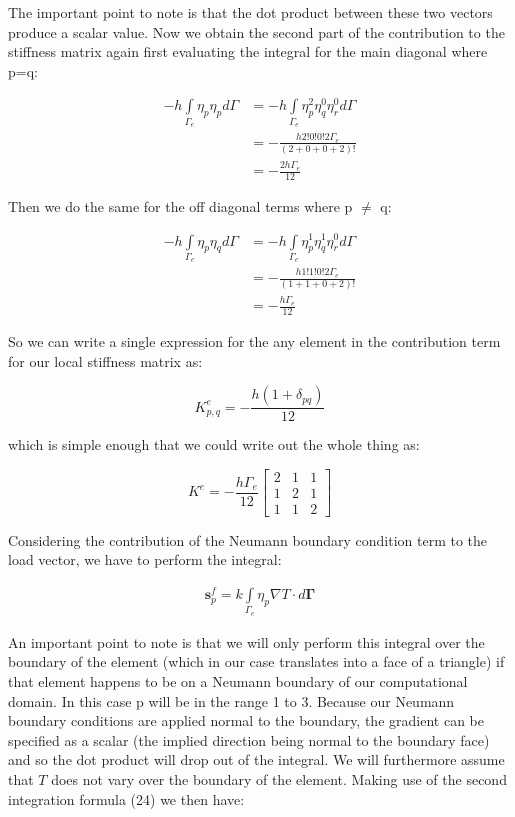 \documentclass[12pt]{article}
\begin{document}
The important point to note is that the dot product between these two vectors
produce a scalar value. Now we obtain the second part of the contribution to the stiffness matrix again first evaluating the integral for the main diagonal where p=q:

\begin{align*}
 -h \int\limits_{\Gamma_e} \eta_p \eta_p d\Gamma & = 
 -h\int\limits_{\Gamma_e} \eta_p^2 \eta_q^0 \eta_r^0  d{\Gamma} \\
 & = -\frac{h 2!0!0!2\Gamma_e}{(2+0+0+2)!} \\
 & = -\frac{2h\Gamma_e}{12}
\end{align*}

Then we do the same for the off diagonal terms where p $\neq$ q:

\begin{align*}
 -h \int\limits_{\Gamma_e} \eta_p \eta_q d\Gamma & = 
 -h\int\limits_{\Gamma_e} \eta_p^1 \eta_q^1 \eta_r^0  d{\Gamma} \\
 & = -\frac{h 1!1!0!2\Gamma_e}{(1+1+0+2)!} \\
 & = -\frac{h\Gamma_e}{12}
\end{align*}

So we can write a single expression for the any element in the contribution term for our local stiffness matrix as:

$$
K_{p,q}^e =- \frac{h (1+\delta_{pq})}{12}
$$

which is simple enough that we could write out the whole thing as:

\begin{equation}
K^e = -\frac{h \Gamma_e}{12}{\begin{bmatrix} 2 & 1 & 1  \\ 1 & 2 & 1  \\ 1 & 1 & 2 \end{bmatrix}}
\end{equation}

Considering the contribution of the Neumann boundary condition term to
the load vector, we have to perform the integral:

\begin{align*}
 \mathbf{s}_p^f = k \int\limits_{\Gamma_{e}}{\eta_p\nabla T} \cdot d \mathbf{\Gamma}
\end{align*}

An important point to note is that we will only perform this integral over the boundary of the element (which in our case translates into a  face of a triangle) if that element happens to be on a Neumann boundary of our computational domain. In this case p will be in the range 1 to 3. Because our Neumann boundary conditions are applied normal to the boundary, the gradient can be specified as a scalar (the implied direction being normal to the boundary face) and so the dot product will drop out of the integral. We will furthermore assume that $T$ does not vary over the boundary of the element. Making use of the second integration formula (24) we then have:
\end{document}
